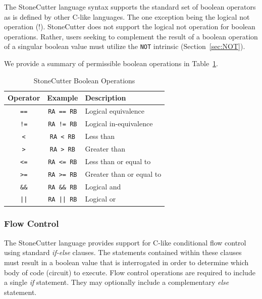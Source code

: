 \documentclass{article}
\begin{document}
The StoneCutter language syntax supports the standard set of boolean 
operators as is defined by other C-like languages.  The one exception being the 
logical not operation (!).  StoneCutter does not support the logical not operation for 
boolean operations.  Rather, users seeking to complement the result of a boolean operation 
of a singular boolean value must utilize the \texttt{NOT} intrinsic (Section~\ref{sec:NOT}).

We provide a summary of permissible boolean operations in Table~\ref{tab:boolops}.

\begin{table}[h]
\begin{center}
\caption{StoneCutter Boolean Operations}
\vspace{0.125in}
\label{tab:boolops}
\begin{tabular}{|c|c|l|}
\hline
\textbf{Operator} & \textbf{Example} & \textbf{Description}\\
\hline
\texttt{==} & \texttt{RA == RB} & Logical equivalence\\
\hline
\texttt{!=} & \texttt{RA != RB} & Logical in-equivalence\\
\hline
\texttt{<} & \texttt{RA < RB} & Less than\\
\hline
\texttt{>} & \texttt{RA > RB} & Greater than\\
\hline
\texttt{<=} & \texttt{RA <= RB} & Less than or equal to\\
\hline
\texttt{>=} & \texttt{RA >= RB} & Greater than or equal to\\
\hline
\texttt{\&\&} & \texttt{RA \&\& RB} & Logical and\\
\hline
\texttt{||} & \texttt{RA || RB} & Logical or\\
\hline
\end{tabular}
\end{center}
\end{table}

\clearpage
\subsubsection{Flow Control}
\label{sec:FlowControl}

The StoneCutter language provides support for C-like conditional flow 
control using standard \textit{if-else} clauses.  The statements contained 
within these clauses must result in a boolean value that is interrogated in order 
to determine which body of code (circuit) to execute.  Flow control operations 
are required to include a single \textit{if} statement.  They may optionally include 
a complementary \textit{else} statement.   
\end{document}
